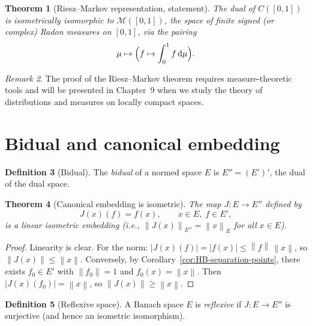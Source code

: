 \documentclass[a4paper,12pt]{book}
\newcommand{\dd}{\mathrm{d}}
\newcommand{\norm}[1]{\left\| #1 \right\|}
\newcommand{\abs}[1]{\left| #1 \right|}
\theoremstyle{definition}
\newtheorem{definition}{Definition}[chapter]
\theoremstyle{plain}
\newtheorem{theorem}[definition]{Theorem}
\theoremstyle{remark}
\newtheorem{remark}[definition]{Remark}
\begin{document}
\begin{theorem}[Riesz--Markov representation, statement]\label{thm:riesz-markov}
The dual of $C([0,1])$ is isometrically isomorphic to $\mathcal{M}([0,1])$, the
space of finite signed (or complex) Radon measures on $[0,1]$, via the pairing
\[
  \mu \mapsto \Bigl(f\mapsto\int_0^1 f\,\dd\mu\Bigr).
\]
\end{theorem}

\begin{remark}
The proof of the Riesz--Markov theorem requires measure-theoretic tools and will
be presented in Chapter~9 when we study the theory of distributions and measures
on locally compact spaces.
\end{remark}

\section{Bidual and canonical embedding}\label{sec:bidual}

\begin{definition}[Bidual]\label{def:bidual}
The \emph{bidual} of a normed space $E$ is $E'' = (E')'$, the dual of the dual
space.
\end{definition}

\begin{theorem}[Canonical embedding is isometric]\label{thm:canonical-embedding}
The map $J\colon E\to E''$ defined by
\[
  J(x)(f) = f(x), \qquad x\in E,\; f\in E',
\]
is a linear isometric embedding (i.e., $\norm{J(x)}_{E''}=\norm{x}_E$ for all
$x\in E$).
\end{theorem}

\begin{proof}
Linearity is clear. For the norm: $\abs{J(x)(f)} = \abs{f(x)}\leq\norm{f}\,\norm{x}$,
so $\norm{J(x)}\leq\norm{x}$. Conversely, by Corollary~\ref{cor:HB-separation-points},
there exists $f_0\in E'$ with $\norm{f_0}=1$ and $f_0(x)=\norm{x}$. Then
$\abs{J(x)(f_0)}=\norm{x}$, so $\norm{J(x)}\geq\norm{x}$.
\end{proof}

\begin{definition}[Reflexive space]\label{def:reflexive}
A Banach space $E$ is \emph{reflexive} if $J\colon E\to E''$ is surjective (and
hence an isometric isomorphism).
\end{definition}
\end{document}
